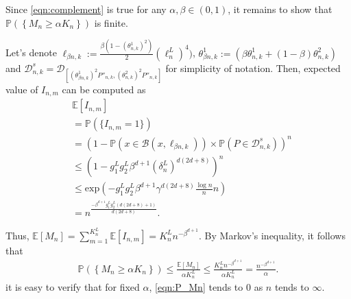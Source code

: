 \documentclass[Afour,sageh,times]{sagej}
\begin{document}
Since \eqref{eqn:complement} is true for any $\alpha,\beta\in(0,1)$, it remains to show that $\mathbb{P}\left(\left\{M_{n} \geq \alpha K_{n}\right\}\right) $ is finite. {
Let's denote $\ell_{\beta n,k}:=\frac{\beta(1-(\theta_{n,k}^1)^2)}{2}(\ell^L_n)^4)$, $\theta^1_{\beta n,k}:= (\beta\theta^1_{n,k}+(1-\beta)\theta^2_{n,k}) $ and $\mathcal{D}^s_{n,k}=\mathcal{D}_{[(\theta^1_{\beta n,k})^2 P''_{n,k},(\theta^2_{ n,k})^2 P''_{n,k}]}$ for simplicity of notation. Then, expected value of $I_{n,m}$ can be computed as 
\begin{align}
    &\mathbb{E}[I_{n,m}]\nonumber\\
    &= \mathbb{P}(\{I_{n,m}=1\}) \nonumber\\
    &=\left( 1- \mathbb{P}(x\in\mathcal{B}(x,\ell_{\beta n,k})) \times  \mathbb{P}(P\in\mathcal{D}^s_{n,k}) \right)^n\nonumber\\
&\leq     \left(1-g^L_1 g^L_2 \beta^{d+1} (\delta^L_n)^{d(2d+8)}\right)^{n}\nonumber\\
    &\leq    \text{exp} \left(-g^L_1 g^L_2 \beta^{d+1} \gamma^{d(2d+8)} \frac{\log n}{n}  n\right)\nonumber\\
    &= n^{\frac{-\beta^{d+1}g_1^Lg_2^L(d(2d+8)+1)}{d(2d+8)}}. \nonumber
\end{align}

Thus, $\mathbb{E}[M_n]=\sum_{m=1}^{K^L_n} \mathbb{E}[I_{n,m}]= K^L_n n^{-\beta ^{d+1}}$. By Markov’s inequality, it follows that
\begin{align}
    \mathbb{P}\left(\left\{M_{n} \geq \alpha K_{n}\right\}\right) \leq \frac{\mathbb{E}[M_n]}{\alpha K^L_n} \leq \frac{K^L_n n^{-\beta ^{d+1}}}{\alpha K^L_n} = \frac{ n^{-\beta ^{d+1}}}{\alpha}.
    \label{eqn:P_Mn}
\end{align}
it is easy to verify that for fixed $\alpha$, \eqref{eqn:P_Mn} tends to $0$ as $n$ tends to $\infty$.
}
\end{document}
